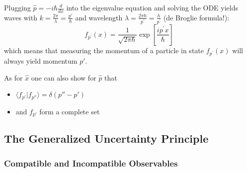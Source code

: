 
Plugging $\hat{p}=-i\hbar \frac{d}{dx}$ into the eigenvalue equation and solving the ODE yields waves with $k=\frac{2 \pi}{\lambda}=\frac{p'}{\hbar}$ and wavelength $\lambda=\frac{2\pi\hbar}{p^{\prime}}=\frac{h}{p^{\prime}}$ (de Broglie formula!):
\begin{equation*}
    f_{p^{\prime}}(x)=\frac{1}{\sqrt{2\pi\hbar}}\exp\left[\frac{ip^{\prime}x}{\hbar}\right]
\end{equation*}
which means that measuring the momentum of a particle in state $f_{p^{\prime}}(x)$ will always yield momentum $p'$.


As for $\hat{x}$ one can also show for $\hat{p}$ that
\begin{itemize}
    \item $\langle f_{p'}|f_{p''}\rangle=\delta(p''-p')$
    \item and $f_{p'}$ form a complete set
\end{itemize}


\subsection{The Generalized Uncertainty Principle}
\subsubsection{Compatible and Incompatible Observables}


